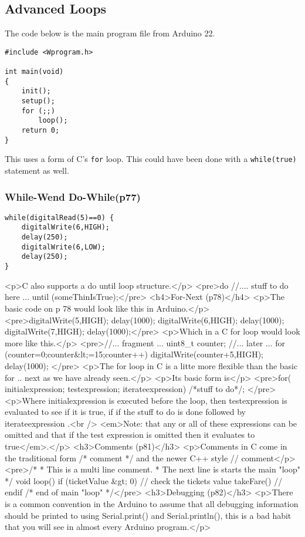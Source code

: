 \documentclass{report}
\begin{document}
{{\subsection{Advanced Loops}
The code below is the main program file from Arduino 22.
\begin{verbatim}
#include <Wprogram.h>

int main(void)
{
	init();
	setup();
	for (;;)
		loop();
	return 0;
}
\end{verbatim}
This uses a form of C's \verb|for| loop. This could have been done with a \verb|while(true)| statement as well.

\subsubsection{While-Wend Do-While(p77)}
\begin{verbatim}
while(digitalRead(5)==0) {
    digitalWrite(6,HIGH);
    delay(250);
    digitalWrite(6,LOW);
    delay(250);
}
\end{verbatim}
<p>C also supports a do until loop structure.</p>
<pre>do {
    //.... stuff to do here ...
} until (someThinIsTrue);</pre>
<h4>For-Next (p78)</h4>
<p>The basic code on p 78 would look like this in Arduino.</p>
<pre>digitalWrite(5,HIGH);
delay(1000);
digitalWrite(6,HIGH);
delay(1000);
digitalWrite(7,HIGH);
delay(1000);</pre>
<p>Which in a C for loop would look more like this.</p>
<pre>//... fragment ...
uint8_t counter;
//... later ...
for (counter=0;counter&lt;=15;counter++) {
   digitalWrite(counter+5,HIGH);
   delay(1000);
}</pre>
<p>The for loop in C is a litte more flexible than the basic for .. next as we have already seen.</p>
<p>Its basic form is</p>
<pre>for( initialexpression; testexpression; iterateexpression)
{
   /*stuff to do*/;
}</pre>
<p>Where initialexpression is executed before the loop, then testexpression is evaluated to see if it is true, if if the stuff to do is done followed by iterateexpression .<br />
<em>Note: that any or all of these expressions can be omitted and that if the test expression is omitted then it evaluates to true</em>.</p>
<h3>Comments (p81)</h3>
<p>Comments in C come in the traditional form /* comment */ and the newer C++ style // comment</p>
<pre>/*
 * This is a multi line comment. 
 * The next line is starts the main "loop"
 */
void loop() {
  if (ticketValue &gt; 0){ // check the tickets value
     takeFare()
  } // endif
} /* end of main "loop" */</pre>
<h3>Debugging (p82)</h3>
<p>There is a common convention in the Arduino to assume that all debugging information should be printed to using Serial.print() and Serial.println(), this is a bad habit that you will see in almost every Arduino program.</p>
}}
\end{document}
